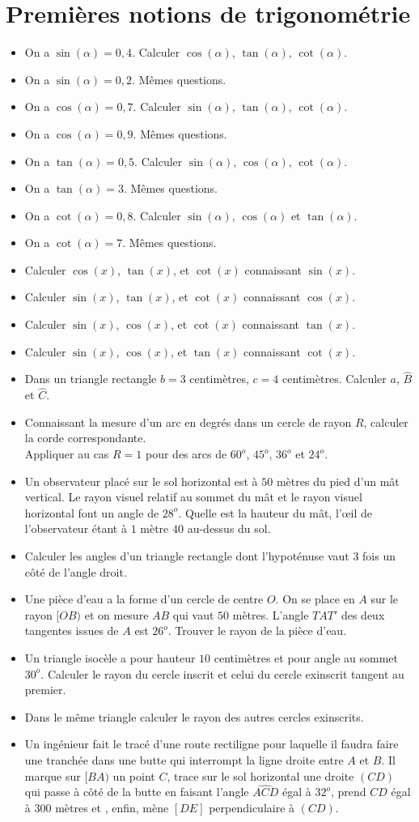 \documentclass[12 pt]{report}
\theoremstyle{plain}
\newcounter{n}
\renewcommand{\it}{\item[$\mathbf{\then}.$]\stepcounter{n} }
\begin{document}
\chapter{Premières notions de trigonométrie} 
\begin{itemize}
\it On a $\sin(\alpha) =0,4$. Calculer $\cos(\alpha)$, $\tan(\alpha)$, 
$\cot(\alpha)$. 
\it On a $\sin(\alpha) = 0,2$. Mêmes questions. 
\it On a $\cos(\alpha) =0,7$. Calculer $\sin(\alpha)$, $\tan(\alpha)$, 
$\cot(\alpha)$. 
\it On a $\cos(\alpha) = 0,9$. Mêmes questions. 
\it On a $\tan(\alpha) = 0,5$. Calculer $\sin(\alpha)$, $\cos(\alpha)$, $\cot(\alpha)$. 
\it On a $\tan(\alpha) = 3$. Mêmes questions. 
\it On a $\cot(\alpha) = 0,8$. Calculer $\sin(\alpha)$, $\cos(\alpha)$ et $\tan(\alpha)$. 
\it On a $\cot(\alpha) = 7$. Mêmes questions. 
\it Calculer $\cos(x)$, $\tan(x)$, et $\cot(x)$ connaissant $\sin(x)$.
\it Calculer $\sin(x)$, $\tan(x)$, et $\cot(x)$ connaissant $\cos(x)$.
\it Calculer $\sin(x)$, $\cos(x)$, et $\cot(x)$ connaissant $\tan(x)$.
\it Calculer $\sin(x)$, $\cos(x)$, et $\tan(x)$ connaissant $\cot(x)$.
\it Dans un triangle rectangle $b=3$ centimètres, $c=4$ centimètres. Calculer $a$, $\widehat{B}$ et $\widehat{C}$. 
\it Connaissant la mesure d'un arc en degrés dans un cercle de rayon $R$, calculer la corde correspondante.\\ Appliquer au cas $R=1$ pour des arcs de $60^o$, $45^o$, $36^o$ et $24^o$. 
\it Un observateur placé sur le sol horizontal est à $50$ mètres du pied d'un mât vertical. Le rayon visuel relatif au sommet du mât et le rayon visuel horizontal font un angle de $28^o$. Quelle est la 
hauteur du mât, l'œil de l'observateur étant à $1$ mètre $40$ au-dessus du sol. 
\it Calculer les angles d'un triangle rectangle dont l'hypoténuse vaut $3$ fois un côté de l'angle droit. 
\it Une pièce d'eau a la forme d'un cercle de centre $O$. On se place en $A$ sur le rayon $[OB)$ et on mesure $AB$ qui vaut $50$ mètres. L'angle $TAT'$ des deux tangentes issues de $A$ est $26^o$. Trouver le rayon de la pièce d'eau. 
\it Un triangle isocèle a pour hauteur $10$ centimètres et pour angle au sommet $30^o$. Calculer le rayon du cercle inscrit et celui du cercle exinscrit tangent au premier. 
\it Dans le même triangle calculer le rayon des autres cercles exinscrits. 
\it Un ingénieur fait le tracé d'une route rectiligne pour laquelle il faudra faire une tranchée dans une butte qui interrompt la ligne droite entre $A$ et $B$. Il marque sur $[BA)$ un point $C$, trace sur le sol horizontal une droite $(CD)$ qui passe à côté de la butte en faisant l'angle $\widehat{ACD}$ égal à $32^o$, prend $CD$ égal à $300$ mètres et , enfin, mène $[DE]$ perpendiculaire à $(CD)$. \\

\end{itemize}
\end{document}
